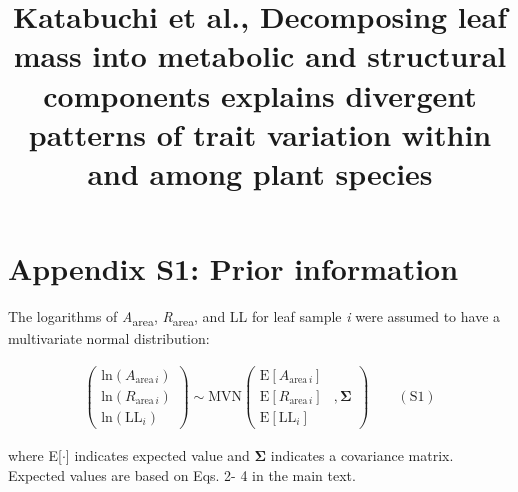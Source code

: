 \documentclass[
  12pt,
  letterpaper,
  DIV=11,
  numbers=noendperiod]{scrartcl}
\title{Katabuchi et al., Decomposing leaf mass into metabolic and
structural components explains divergent patterns of trait variation
within and among plant species}
\author{}
\date{}
\renewcommand*\contentsname{Table of contents}
\newcommand\contentsname{Table of contents}
\begin{document}
\maketitle
\ifdefined\Shaded\renewenvironment{Shaded}{\begin{tcolorbox}[breakable, boxrule=0pt, sharp corners, borderline west={3pt}{0pt}{shadecolor}, frame hidden, enhanced, interior hidden]}{\end{tcolorbox}}\fi

\renewcommand*\contentsname{Table of contents}
{
\hypersetup{linkcolor=}
\setcounter{tocdepth}{3}
\tableofcontents
}
\newpage

\hypertarget{appendix-s1-prior-information}{%
\section{Appendix S1: Prior
information}\label{appendix-s1-prior-information}}

The logarithms of \emph{A}\textsubscript{area},
\emph{R}\textsubscript{area}, and LL for leaf sample \emph{i} were
assumed to have a multivariate normal distribution:

\[
\begin{aligned}
\left(
\begin{array}{ccc}
\mathrm{ln}(A_{\mathrm{area} \, i})\\
\mathrm{ln}(R_{\mathrm{area} \, i}) \\
\mathrm{ln}(\mathrm{LL}_i)
\end{array}
\right)
\sim \mathrm{MVN}
\left(
\begin{array}{rrr}
\mathrm{E}[A_{\mathrm{area} \, i}] & \\
\mathrm{E}[R_{\mathrm{area} \, i}] &, \boldsymbol{\Sigma}\\
\mathrm{E}[\mathrm{LL}_i] &
\end{array}
\right) \qquad(\mathrm{S}1)
\end{aligned}
\]

where E{[}\(\cdot\){]} indicates expected value and
\(\boldsymbol{\Sigma}\) indicates a covariance matrix. Expected values
are based on Eqs. 2- 4 in the main text.
\end{document}
